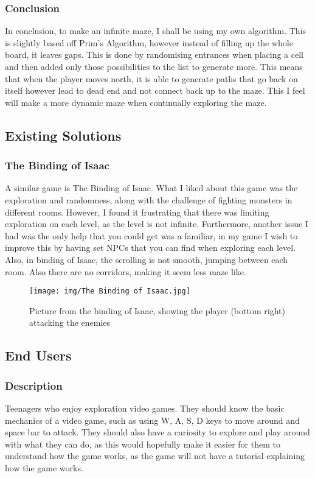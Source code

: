 \documentclass[../Main.tex]{subfiles}
\begin{document}
        \subsubsection{Conclusion}
            In conclusion, to make an infinite maze, I shall be using my own algorithm. This is slightly based off Prim's Algorithm, however instead of filling up the whole board, it leaves gaps. This is done by randomising entrances when placing a cell and then added only those possibilities to the list to generate more. This means that when the player moves north, it is able to generate paths that go back on itself however lead to dead end and not connect back up to the maze. This I feel will make a more dynamic maze when continually exploring the maze.
    \clearpage
    \subsection{Existing Solutions}
        \subsubsection{The Binding of Isaac}
            A similar game is The Binding of Isaac. What I liked about this game was the exploration and randomness, along with the challenge of fighting monsters in different rooms. However, I found it frustrating that there was limiting exploration on each level, as the level is not infinite. Furthermore, another issue I had was the only help that you could get was a familiar, in my game I wish to improve this by having set NPCs that you can find when exploring each level. Also, in binding of Isaac, the scrolling is  not smooth, jumping between each room. Also there are no corridors, making it seem less maze like.
            \begin{figure}[hbt!]
                \centerline{\texttt{[image: img/The Binding of Isaac.jpg]}}
                \caption{Picture from the binding of Isaac, showing the player (bottom right) attacking the enemies}
            \end{figure}
    \clearpage
    \subsection{End Users}
        \subsubsection{\textbf{Description}}
            Teenagers who enjoy exploration video games. They should know the basic mechanics of a video game, such as using W, A, S, D keys to move around and space bar to attack. They should also have a curiosity to explore and play around with what they can do, as this would hopefully make it easier for them to understand how the game works, as the game will not have a tutorial explaining how the game works.
\end{document}
